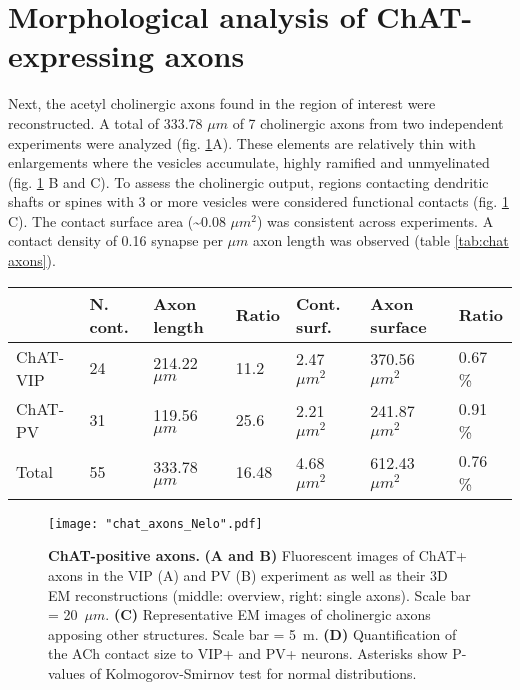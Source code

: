 \section{Morphological analysis of ChAT-expressing axons}
\label{sec:ChAT axons}
Next, the acetyl cholinergic axons found in the region of interest were reconstructed. A total of 333.78 $\mu m$ of  7 cholinergic axons from two independent experiments were analyzed (fig. \ref{fig:chat_axons}A). These elements are relatively thin with enlargements where the vesicles accumulate, highly ramified and unmyelinated (fig. \ref{fig:chat_axons} B and C). To assess the cholinergic output, regions contacting dendritic shafts or spines with 3 or more vesicles were considered functional contacts (fig. \ref{fig:chat_axons} C). The contact surface area (\textasciitilde 0.08 $\mu m^2$) was consistent across experiments. A contact density of 0.16 synapse per $\mu m$ axon length was observed (table \ref{tab:chat axons}).\\
\label{tab:chat axons}
\begin{tabular} {|l|l|l|l|l|l|l|}
	\hline
	& N. cont. & Axon length & Ratio & Cont. surf. & Axon surface & Ratio\\ 
	\hline
	ChAT-VIP & 24 & 214.22 $\mu m$ & 11.2 & 2.47 $\mu m^2$ & 370.56 $\mu m^2$ & 0.67 \%\\
	\hline
	ChAT-PV & 31 & 119.56 $\mu m$ & 25.6 & 2.21 $\mu m^2$ & 241.87 $\mu m^2$ & 0.91 \%\\
    \hline
    Total & 55 & 333.78 $\mu m$ & 16.48 & 4.68 $\mu m^2$ & 612.43 $\mu m^2$ & 0.76 \%\\
    \hline 
\end{tabular}
\begin{figure}
	\captionsetup[figure]{indentation=0pt}
	\texttt{[image: "chat\_axons\_Nelo".pdf]}
	\caption[ChAT-positive axons]{\textbf{ChAT-positive axons.} \textbf{(A and B)} Fluorescent images of ChAT+ axons in the VIP (A) and PV (B) experiment as well as their 3D EM reconstructions (middle: overview, right: single axons). Scale bar = 20~$\mu m$. \textbf{(C)} Representative EM images of cholinergic axons apposing other structures. Scale bar = 5~\textmu m. \textbf{(D)} Quantification of the ACh contact size to VIP+ and PV+ neurons. Asterisks show P-values of Kolmogorov-Smirnov test for normal distributions.}
	\label{fig:chat_axons}
\end{figure}
